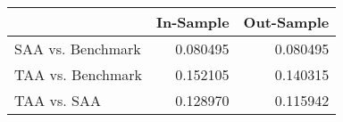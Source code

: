 \begin{tabular}{lrr}
\toprule
{} &  In-Sample &  Out-Sample \\
\midrule
SAA vs. Benchmark &   0.080495 &    0.080495 \\
TAA vs. Benchmark &   0.152105 &    0.140315 \\
TAA vs. SAA       &   0.128970 &    0.115942 \\
\bottomrule
\end{tabular}
